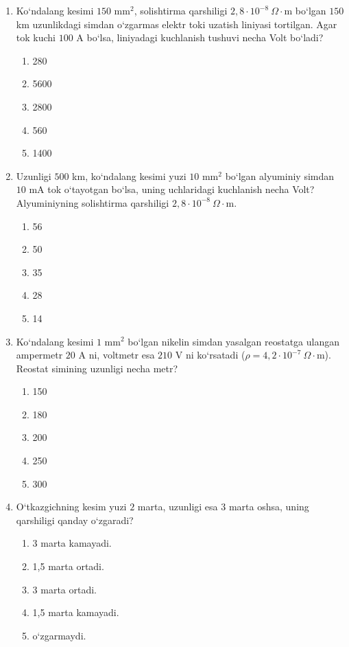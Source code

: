 \begin{enumerate}
\item Ko‘ndalang kesimi $150$ mm$^2$, solishtirma qarshiligi $2,8\cdot10^{-8}~\Omega\cdot$m bo‘lgan $150$ km uzunlikdagi simdan o‘zgarmas elektr toki uzatish liniyasi tortilgan. Agar tok kuchi $100$ A bo‘lsa, liniyadagi kuchlanish tushuvi necha Volt bo‘ladi?
\begin{enumerate}[label=\Alph*)]
\item 280
\item 5600
\item 2800
\item 560
\item 1400
\end{enumerate}

\item Uzunligi $500$ km, ko‘ndalang kesimi yuzi $10$ mm$^2$ bo‘lgan alyuminiy simdan $10$ mA tok o‘tayotgan bo‘lsa, uning uchlaridagi kuchlanish necha Volt? Alyuminiyning solishtirma qarshiligi $2,8\cdot10^{-8}~\Omega\cdot$m.
\begin{enumerate}[label=\Alph*)]
\item 56
\item 50
\item 35
\item 28
\item 14
\end{enumerate}

\item Ko‘ndalang kesimi $1$ mm$^2$ bo‘lgan nikelin simdan yasalgan reostatga ulangan ampermetr $20$ A ni, voltmetr esa $210$ V ni ko‘rsatadi ($\rho=4,2\cdot10^{-7}~\Omega\cdot$m). Reostat simining uzunligi necha metr?
\begin{enumerate}[label=\Alph*)]
\item 150
\item 180
\item 200
\item 250
\item 300
\end{enumerate}

\item O‘tkazgichning kesim yuzi $2$ marta, uzunligi esa $3$ marta oshsa, uning qarshiligi qanday o‘zgaradi?
\begin{enumerate}[label=\Alph*)]
\item 3 marta kamayadi.
\item 1,5 marta ortadi.
\item 3 marta ortadi.
\item 1,5 marta kamayadi.
\item o‘zgarmaydi.
\end{enumerate}


\end{enumerate}
